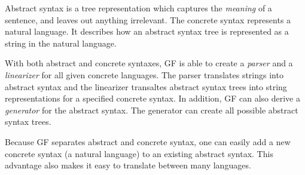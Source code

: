 Abstract syntax is a tree representation which captures the \emph{meaning} of a sentence, and leaves out anything irrelevant. The concrete syntax represents a natural language. It describes how an abstract syntax tree is represented as a string in the natural language.

With both abstract and concrete syntaxes, GF is able to create a \emph{parser} and a \emph{linearizer} for all given concrete languages. The parser translates strings into abstract syntax and the linearizer transaltes abstract syntax trees into string representations for a specified concrete syntax. In addition, GF can also derive a \emph{generator} for the abstract syntax. The generator can create all possible abstract syntax trees.

Because GF separates abstract and concrete syntax, one can easily add a new concrete syntax (a natural language) to an existing abstract syntax. This advantage also makes it easy to translate between many languages.